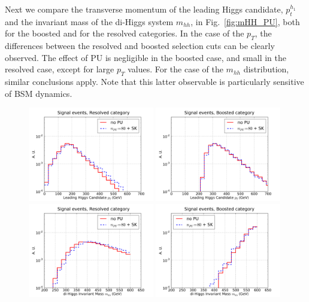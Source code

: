 Next we compare the transverse momentum of the leading Higgs
candidate, $p_t^{h_1}$ and the invariant mass of the di-Higgs system
$m_{hh}$, in Fig.~\ref{fig:mHH_PU}, both for the boosted and
for the resolved categories.
%
In the case of the $p_T$, the differences between the resolved
and boosted selection cuts can be clearly observed.
%
The effect of PU is negligible in the boosted case, and small
in the resolved case, except for large $p_T$ values.
%
For the case of the $m_{hh}$ distribution, similar conclusions
apply.
%
Note that this latter observable is particularly sensitive
of BSM dynamics.


\begin{figure}[t]
  \begin{center}
    \vspace{-1cm}
  \includegraphics[width=0.49\textwidth]{plots/pt_H0_C2_res_comp.pdf}
  \includegraphics[width=0.49\textwidth]{plots/pt_H0_C2_bst_comp.pdf}
  \includegraphics[width=0.49\textwidth]{plots/m_HH_C2_res_comp.pdf}
  \includegraphics[width=0.49\textwidth]{plots/m_HH_C2_bst_comp.pdf}

\end{center}
\end{figure}
